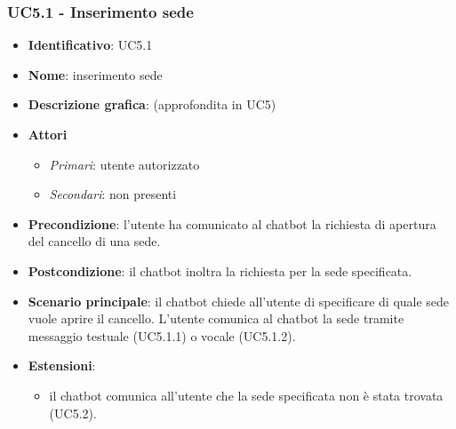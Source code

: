 \subsubsection{UC5.1 - Inserimento sede}
\begin{itemize}
    \item \textbf{Identificativo}: UC5.1
    \item \textbf{Nome}: inserimento sede
    \item \textbf{Descrizione grafica}: (approfondita in UC5)
    \item \textbf{Attori}
 \begin{itemize} 
    \item \textit{Primari}: utente autorizzato 
    \item \textit{Secondari}: non presenti
 \end{itemize}
 \item \textbf{Precondizione}: l'utente ha comunicato al chatbot la richiesta di apertura del cancello di una sede.
 \item \textbf{Postcondizione}: il chatbot inoltra la richiesta per la sede specificata.
 \item \textbf{Scenario principale}: il chatbot chiede all'utente di specificare di quale sede vuole aprire il cancello. L'utente comunica al chatbot la sede tramite messaggio testuale (UC5.1.1) o vocale (UC5.1.2).
\item \textbf{Estensioni}: 
 \begin{itemize} 
    \item il chatbot comunica all'utente che la sede specificata non è stata trovata (UC5.2).
 \end{itemize}
\end{itemize}

